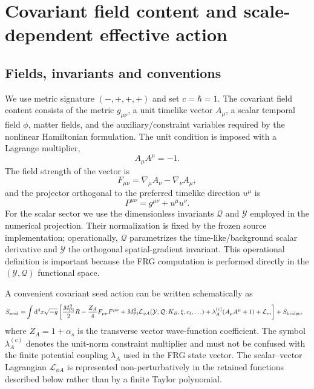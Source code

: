 \documentclass[12pt]{iopart}
\newcommand{\mpl}{M_{\rm Pl}}
\newcommand{\dd}{\mathrm{d}}
\newcommand{\cL}{\mathcal L}
\newcommand{\Q}{\mathcal Q}
\newcommand{\Y}{\mathcal Y}
\begin{document}
\section{Covariant field content and scale-dependent effective action}
\label{sec:theory}

\subsection{Fields, invariants and conventions}

We use metric signature $(-,+,+,+)$ and set $c=\hbar=1$.  The covariant field content consists of the metric $g_{\mu\nu}$, a unit timelike vector $A_\mu$, a scalar temporal field $\phi$, matter fields, and the auxiliary/constraint variables required by the nonlinear Hamiltonian formulation.  The unit condition is imposed with a Lagrange multiplier,
\begin{equation}
 A_\mu A^\mu=-1.
\label{eq:unit}
\end{equation}
The field strength of the vector is
\begin{equation}
 F_{\mu\nu}=\nabla_\mu A_\nu-\nabla_\nu A_\mu,
\end{equation}
and the projector orthogonal to the preferred timelike direction $u^\mu$ is
\begin{equation}
 P^{\mu\nu}=g^{\mu\nu}+u^\mu u^\nu.
\label{eq:projector}
\end{equation}
For the scalar sector we use the dimensionless invariants $\Q$ and $\Y$ employed in the numerical projection.  Their normalization is fixed by the frozen source implementation; operationally, $\Q$ parametrizes the time-like/background scalar derivative and $\Y$ the orthogonal spatial-gradient invariant.  This operational definition is important because the FRG computation is performed directly in the $(\Y,\Q)$ functional space.

A convenient covariant seed action can be written schematically as
\begin{equation}
\begin{split}
S_{\rm seed}=&\int \dd^4x\sqrt{-g}\left[
\frac{\mpl^2}{2}R
-\frac{Z_A}{4}F_{\mu\nu}F^{\mu\nu}
+\mpl^2\cL_{\phi A}(\Y,\Q;K_B,\xi,c_t,\ldots)
+\lambda_A^{(c)}(A_\mu A^\mu+1)
+\cL_m
\right]
+S_{\rm bridge},
\end{split}
\label{eq:seed}
\end{equation}
where $Z_A=1+\alpha_s$ is the transverse vector wave-function coefficient.  The symbol $\lambda_A^{(c)}$ denotes the unit-norm constraint multiplier and must not be confused with the finite potential coupling $\lambda_A$ used in the FRG state vector.  The scalar--vector Lagrangian $\cL_{\phi A}$ is represented non-perturbatively in the retained functions described below rather than by a finite Taylor polynomial.
\end{document}
